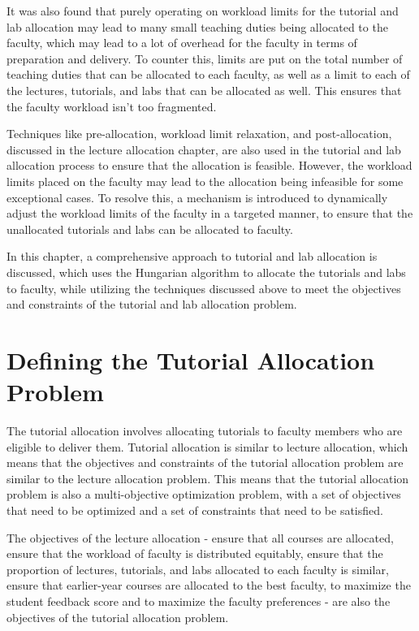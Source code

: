 It was also found that purely operating on workload limits for the tutorial and lab allocation may lead to many small teaching duties being allocated to the faculty, which may lead to a lot of overhead for the faculty in terms of preparation and delivery. To counter this, limits are put on the total number of teaching duties that can be allocated to each faculty, as well as a limit to each of the lectures, tutorials, and labs that can be allocated as well. This ensures that the faculty workload isn't too fragmented.

Techniques like pre-allocation, workload limit relaxation, and post-allocation, discussed in the lecture allocation chapter, are also used in the tutorial and lab allocation process to ensure that the allocation is feasible. However, the workload limits placed on the faculty may lead to the allocation being infeasible for some exceptional cases. To resolve this, a mechanism is introduced to dynamically adjust the workload limits of the faculty in a targeted manner, to ensure that the unallocated tutorials and labs can be allocated to faculty.

In this chapter, a comprehensive approach to tutorial and lab allocation is discussed, which uses the Hungarian algorithm to allocate the tutorials and labs to faculty, while utilizing the techniques discussed above to meet the objectives and constraints of the tutorial and lab allocation problem.

\section{Defining the Tutorial Allocation Problem}

The tutorial allocation involves allocating tutorials to faculty members who are eligible to deliver them. Tutorial allocation is similar to lecture allocation, which means that the objectives and constraints of the tutorial allocation problem are similar to the lecture allocation problem. This means that the tutorial allocation problem is also a multi-objective optimization problem, with a set of objectives that need to be optimized and a set of constraints that need to be satisfied.

The objectives of the lecture allocation - ensure that all courses are allocated, ensure that the workload of faculty is distributed equitably, ensure that the proportion of lectures, tutorials, and labs allocated to each faculty is similar, ensure that earlier-year courses are allocated to the best faculty, to maximize the student feedback score and to maximize the faculty preferences - are also the objectives of the tutorial allocation problem.

